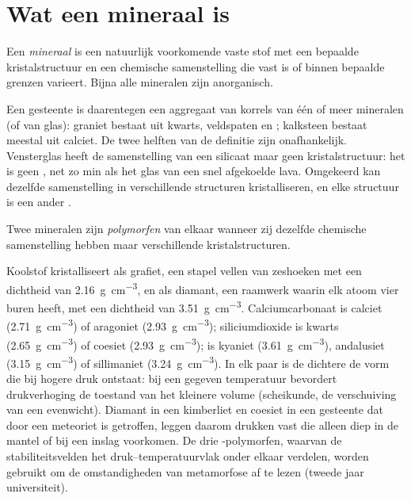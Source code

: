 \section{Wat een mineraal is}

\begin{definition}[Mineraal]\label{def:b1:rock-forming-minerals:mineral}
Een \emph{mineraal} is een natuurlijk voorkomende vaste stof met een bepaalde kristalstructuur en een
chemische samenstelling die vast is of binnen bepaalde grenzen varieert. Bijna alle mineralen zijn anorganisch.
\end{definition}

Een gesteente is daarentegen een aggregaat van korrels van één of meer mineralen (of van glas): graniet bestaat uit
kwarts, veldspaten en ; kalksteen bestaat meestal uit calciet. De twee helften van de definitie zijn onafhankelijk.
Vensterglas heeft de samenstelling van een silicaat maar geen kristalstructuur: het is geen , net zo min als
het glas van een snel afgekoelde lava. Omgekeerd kan dezelfde samenstelling in verschillende structuren kristalliseren,
en elke structuur is een ander .

\begin{definition}[Polymorf]\label{def:b1:rock-forming-minerals:polymorph}
Twee mineralen zijn \emph{polymorfen} van elkaar wanneer zij dezelfde chemische samenstelling hebben
maar verschillende kristalstructuren.
\end{definition}

Koolstof kristalliseert als grafiet, een stapel vellen van zeshoeken met een dichtheid van \qty{2.16}{g.cm^{-3}}, en als
diamant, een raamwerk waarin elk atoom vier buren heeft, met een dichtheid van \qty{3.51}{g.cm^{-3}}. Calciumcarbonaat is
calciet (\qty{2.71}{g.cm^{-3}}) of aragoniet (\qty{2.93}{g.cm^{-3}}); siliciumdioxide is kwarts (\qty{2.65}{g.cm^{-3}})
of coesiet (\qty{2.93}{g.cm^{-3}});  is kyaniet (\qty{3.61}{g.cm^{-3}}), andalusiet (\qty{3.15}{g.cm^{-3}})
of sillimaniet (\qty{3.24}{g.cm^{-3}}).
In elk paar is de dichtere  de vorm die bij hogere druk ontstaat: bij een gegeven temperatuur bevordert
drukverhoging de toestand van het kleinere volume (scheikunde, de verschuiving van een evenwicht). Diamant in een
kimberliet en coesiet in een gesteente dat door een meteoriet is getroffen, leggen daarom drukken vast die alleen diep in
de mantel of bij een inslag voorkomen. De drie -polymorfen, waarvan de stabiliteitsvelden het druk--temperatuurvlak
onder elkaar verdelen, worden gebruikt om de omstandigheden van metamorfose af te lezen (tweede jaar universiteit).

